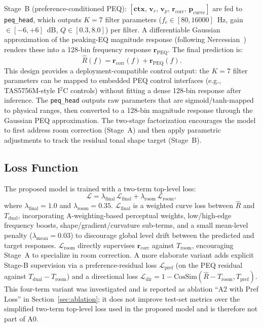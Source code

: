 \documentclass{aes2e}
\begin{document}
Stage~B (preference-conditioned PEQ):
$[\mathbf{ctx},\, \mathbf{v}_r,\, \mathbf{v}_p,\, \mathbf{r}_\text{corr},\,
\mathbf{p}_\text{curve}]$ are fed to \texttt{peq\_head}, which outputs
$K=7$ filter parameters ($f_c \in [80, 16000]$~Hz, gain $\in [-6, +6]$~dB,
$Q \in [0.3, 8.0]$) per filter.
A differentiable Gaussian approximation of the peaking-EQ magnitude response
(following Nercessian~\cite{nercessian2020}) renders these into a 128-bin
frequency response $\mathbf{r}_\text{PEQ}$.
The final prediction is:
\begin{equation}
  \hat{R}(f) = \mathbf{r}_\text{corr}(f) + \mathbf{r}_\text{PEQ}(f).
\end{equation}
This design provides a deployment-compatible control output: the $K=7$
filter parameters can be mapped to embedded PEQ control interfaces
(e.g., TAS5756M-style I$^2$C controls) without fitting a dense 128-bin
response after inference. The \texttt{peq\_head} outputs raw parameters
that are sigmoid/tanh-mapped to physical ranges, then converted to a
128-bin magnitude response through the Gaussian PEQ approximation.
The two-stage factorization encourages the model to first address room
correction (Stage~A) and then apply parametric adjustments to track the
residual tonal shape target (Stage~B).

\subsection{Loss Function}

The proposed model is trained with a two-term top-level loss:
\begin{equation}
  \mathcal{L} = \lambda_\text{final}\,\mathcal{L}_\text{final} +
                \lambda_\text{room}\,\mathcal{L}_\text{room},
\end{equation}
where $\lambda_\text{final}=1.0$ and $\lambda_\text{room}=0.35$.
$\mathcal{L}_\text{final}$ is a weighted curve loss between
$\hat{R}$ and $T_\text{dual}$, incorporating A-weighting-based perceptual
weights, low/high-edge frequency boosts, shape/gradient/curvature
sub-terms, and a small mean-level penalty ($\lambda_\text{mean}=0.03$)
to discourage global level drift between the predicted and target
responses.
$\mathcal{L}_\text{room}$ directly supervises $\mathbf{r}_\text{corr}$
against $T_\text{room}$, encouraging Stage~A to specialize in room
correction.
A more elaborate variant adds explicit Stage-B supervision via a
preference-residual loss $\mathcal{L}_\text{pref}$ (on the PEQ residual
against $T_\text{dual} - T_\text{room}$) and a directional loss
$\mathcal{L}_\text{dir} = 1 - \text{CosSim}(\hat{R} - T_\text{room},
T_\text{pref})$.
This four-term variant was investigated and is reported as ablation
``A2 with Pref Loss'' in Section~\ref{sec:ablation}; it does not improve
test-set metrics over the simplified two-term top-level loss used in the
proposed model and is therefore not part of A0.
\end{document}
